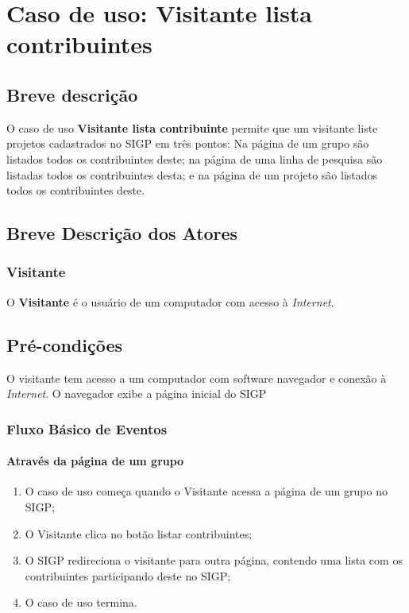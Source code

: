 \documentclass[11pt, a4paper,oneside]{book}
\begin{document}
\chapter[Caso de Uso]{Caso de uso: \bf Visitante lista contribuintes}
\label{cap:casodeuso}	

\section{Breve descrição}

O caso de uso \textbf{Visitante lista contribuinte} permite que um visitante liste projetos cadastrados no SIGP em três pontos: Na página de um grupo são listados todos os contribuintes deste; na página de uma linha de pesquisa são listadas todos os contribuintes desta; e na página de um projeto são listados todos os contribuintes deste.

\section{Breve Descrição dos Atores}

\subsection{Visitante}

O \textbf{Visitante} é o usuário de um computador com acesso à \emph{Internet}.

\section{Pré-condições}
O visitante tem acesso a um computador com software navegador e conexão à \emph{Internet}.
O navegador exibe a página inicial do SIGP

\subsection{Fluxo Básico de Eventos}

\subsubsection{Através da página de um grupo}
\begin{enumerate}
\item O caso de uso começa quando o Visitante acessa a página de um grupo no SIGP;
\item O Visitante clica no botão listar contribuintes;
\item O SIGP redireciona o visitante para outra página, contendo uma lista com os contribuintes participando deste no SIGP;
\item O caso de uso termina.
\end{enumerate}
\end{document}
